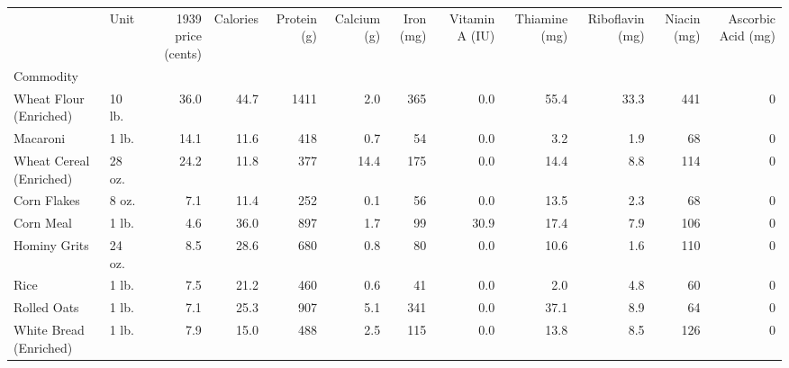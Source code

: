 \documentclass[
  ignorenonframetext,
]{beamer}
\begin{document}
\begin{frame}[fragile]
\begin{tabular}{llrrrrrrrrrr}
\toprule
{} &        Unit &  1939 price (cents) &  Calories &  Protein (g) &  Calcium (g) &  Iron (mg) &  Vitamin A (IU) &  Thiamine (mg) &  Riboflavin (mg) &  Niacin (mg) &  Ascorbic Acid (mg) \\
Commodity               &             &                     &           &              &              &            &                 &                &                  &              &                     \\
\midrule
Wheat Flour (Enriched)  &      10 lb. &                36.0 &      44.7 &         1411 &          2.0 &        365 &             0.0 &           55.4 &             33.3 &          441 &                   0 \\
Macaroni                &       1 lb. &                14.1 &      11.6 &          418 &          0.7 &         54 &             0.0 &            3.2 &              1.9 &           68 &                   0 \\
Wheat Cereal (Enriched) &      28 oz. &                24.2 &      11.8 &          377 &         14.4 &        175 &             0.0 &           14.4 &              8.8 &          114 &                   0 \\
Corn Flakes             &       8 oz. &                 7.1 &      11.4 &          252 &          0.1 &         56 &             0.0 &           13.5 &              2.3 &           68 &                   0 \\
Corn Meal               &       1 lb. &                 4.6 &      36.0 &          897 &          1.7 &         99 &            30.9 &           17.4 &              7.9 &          106 &                   0 \\
Hominy Grits            &      24 oz. &                 8.5 &      28.6 &          680 &          0.8 &         80 &             0.0 &           10.6 &              1.6 &          110 &                   0 \\
Rice                    &       1 lb. &                 7.5 &      21.2 &          460 &          0.6 &         41 &             0.0 &            2.0 &              4.8 &           60 &                   0 \\
Rolled Oats             &       1 lb. &                 7.1 &      25.3 &          907 &          5.1 &        341 &             0.0 &           37.1 &              8.9 &           64 &                   0 \\
White Bread (Enriched)  &       1 lb. &                 7.9 &      15.0 &          488 &          2.5 &        115 &             0.0 &           13.8 &              8.5 &          126 &                   0 \\

\end{tabular}
\end{frame}
\end{document}
